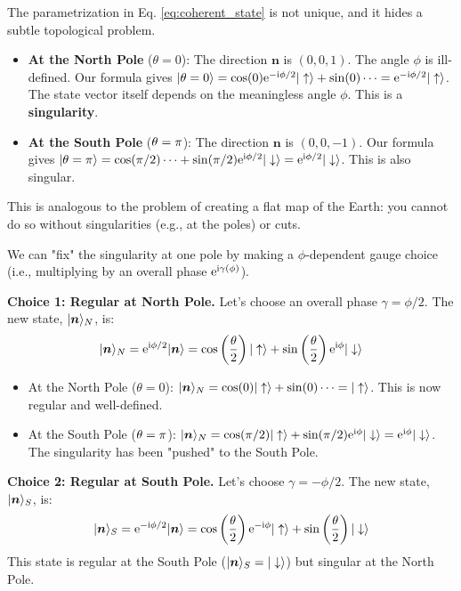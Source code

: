The parametrization in Eq. \eqref{eq:coherent_state} is not unique, and it hides a subtle topological problem.
\begin{itemize}
    \item \textbf{At the North Pole} ($\theta=0$): The direction $\bm{n}$ is $(0,0,1)$. The angle $\phi$ is ill-defined. Our formula gives $|\theta=0\rangle = \cos(0)\mathrm{e}^{-\mathrm{i}\phi/2}|\uparrow\rangle + \sin(0)\dots = \mathrm{e}^{-\mathrm{i}\phi/2} |\uparrow\rangle$. The state vector itself depends on the meaningless angle $\phi$. This is a \textbf{singularity}.
    \item \textbf{At the South Pole} ($\theta=\mathrm{\pi}$): The direction $\bm{n}$ is $(0,0,-1)$. Our formula gives $|\theta=\mathrm{\pi}\rangle = \cos(\mathrm{\pi}/2)\dots + \sin(\mathrm{\pi}/2)\mathrm{e}^{\mathrm{i}\phi/2}|\downarrow\rangle = \mathrm{e}^{\mathrm{i}\phi/2} |\downarrow\rangle$. This is also singular.
\end{itemize}
This is analogous to the problem of creating a flat map of the Earth: you cannot do so without singularities (e.g., at the poles) or cuts.

We can "fix" the singularity at one pole by making a $\phi$-dependent gauge choice (i.e., multiplying by an overall phase $\mathrm{e}^{\mathrm{i}\gamma(\phi)}$).

\textbf{Choice 1: Regular at North Pole.}
Let's choose an overall phase $\gamma = \phi/2$. The new state, $|\bm{n}\rangle_N$, is:
\begin{equation}
    |\bm{n}\rangle_N = \mathrm{e}^{\mathrm{i}\phi/2} |\bm{n}\rangle = \cos\left(\frac{\theta}{2}\right) |\uparrow\rangle + \sin\left(\frac{\theta}{2}\right) \mathrm{e}^{\mathrm{i}\phi} |\downarrow\rangle
\end{equation}
\begin{itemize}
    \item At the North Pole ($\theta=0$): $|\bm{n}\rangle_N = \cos(0)|\uparrow\rangle + \sin(0)\dots = |\uparrow\rangle$. This is now regular and well-defined.
    \item At the South Pole ($\theta=\mathrm{\pi}$): $|\bm{n}\rangle_N = \cos(\mathrm{\pi}/2)|\uparrow\rangle + \sin(\mathrm{\pi}/2)\mathrm{e}^{\mathrm{i}\phi}|\downarrow\rangle = \mathrm{e}^{\mathrm{i}\phi}|\downarrow\rangle$. The singularity has been "pushed" to the South Pole.
\end{itemize}

\textbf{Choice 2: Regular at South Pole.}
Let's choose $\gamma = -\phi/2$. The new state, $|\bm{n}\rangle_S$, is:
\begin{equation}
    |\bm{n}\rangle_S = \mathrm{e}^{-\mathrm{i}\phi/2} |\bm{n}\rangle = \cos\left(\frac{\theta}{2}\right) \mathrm{e}^{-\mathrm{i}\phi} |\uparrow\rangle + \sin\left(\frac{\theta}{2}\right) |\downarrow\rangle
\end{equation}
This state is regular at the South Pole ($|\bm{n}\rangle_S = |\downarrow\rangle$) but singular at the North Pole.

